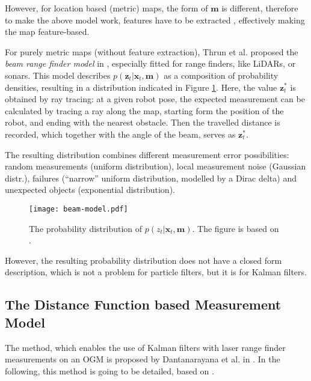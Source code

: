 However, for location based (metric) maps, the form of $\mathbf{m}$ is different, therefore
to make the above model work, features have to be extracted \cite{Durrant-Whyte1991},
effectively making the map feature-based.

For purely metric maps (without feature extraction), Thrun et al. proposed the \emph{beam range finder model}
in \cite{Thrun2005}, especially fitted for range finders, like LiDARs, or sonars.
This model describes  $p(\mathbf{\mathbf{z}}_t | \mathbf{x}_t,\mathbf{m})$ as a composition of
probability densities, resulting in a distribution indicated in Figure \ref{fig:beam-model}.
Here, the value $\mathbf{z}_t^*$ is obtained by ray tracing: at a given robot pose,
the expected measurement can be calculated by tracing a ray along the map, starting form
the position of the robot, and ending with the nearest obstacle. Then the travelled distance is recorded,
which together with the angle of the beam, serves as $\mathbf{z}_t^*$.

The resulting distribution combines different measurement error possibilities:
random measurements (uniform distribution), local measurement noise (Gaussian distr.),
failures (``narrow'' uniform distribution, modelled by a Dirac delta) and unexpected
objects (exponential distribution).
\begin{figure}[htbp]
    \centering
    \texttt{[image: beam-model.pdf]}
    \caption{The probability distribution of $p(z_t | \mathbf{x}_t,\mathbf{m})$.
        The figure is based on \cite{Thrun2005}.}
    \label{fig:beam-model}
\end{figure}

However, the resulting probability distribution does not have a closed form description, which is
not a problem for particle filters, but it is for Kalman filters.

\subsection{The Distance Function based Measurement Model}\label{subsec:dt-meas-model}
The method, which enables the use of Kalman filters with laser range finder measurements on an OGM is proposed
by Dantanarayana et al. in \cite{Dantanarayana2013,Dantanarayana2016}.
In the following, this method is going to be detailed, based on \cite{Dantanarayana2016b}.

